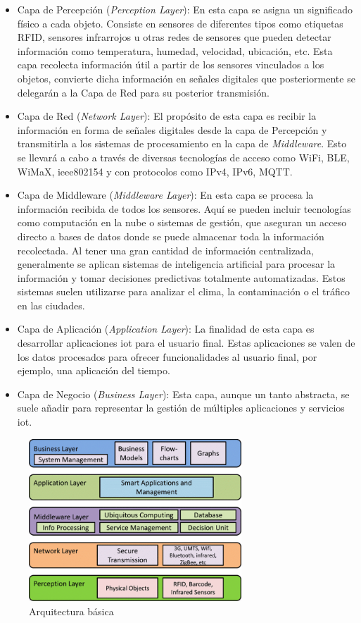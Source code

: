 \begin{itemize}


    \item Capa de Percepción (\textit{Perception Layer}): En esta capa se asigna un significado físico a cada objeto. Consiste en sensores de diferentes tipos como etiquetas RFID, sensores infrarrojos u otras redes de sensores que pueden detectar información como temperatura, humedad, velocidad, ubicación, etc. Esta capa recolecta información útil a partir de los sensores vinculados a los objetos, convierte dicha información en señales digitales que posteriormente se delegarán a la Capa de Red para su posterior transmisión.

    \item Capa de Red (\textit{Network Layer}): El propósito de esta capa es recibir la información en forma de señales digitales desde la capa de Percepción y transmitirla a los sistemas de procesamiento en la capa de \textit{Middleware}. Esto se llevará a cabo a través de diversas tecnologías de acceso como WiFi, BLE, WiMaX, ieee802154 y con protocolos como IPv4, IPv6, MQTT.

    \item Capa de Middleware (\textit{Middleware Layer}): En esta capa se procesa la información recibida de todos los sensores. Aquí se pueden incluir tecnologías como computación en la nube o sistemas de gestión, que aseguran un acceso directo a bases de datos donde se puede almacenar toda la información recolectada. Al tener una gran cantidad de información centralizada, generalmente se aplican sistemas de inteligencia artificial para procesar la información y tomar decisiones predictivas totalmente automatizadas. Estos sistemas suelen utilizarse para analizar el clima, la contaminación o el tráfico en las ciudades.

    \item Capa de Aplicación (\textit{Application Layer}): La finalidad de esta capa es desarrollar aplicaciones \gls{iot} para el usuario final. Estas aplicaciones se valen de los datos procesados para ofrecer funcionalidades al usuario final, por ejemplo, una aplicación del tiempo.

    \item Capa de Negocio (\textit{Business Layer}): Esta capa, aunque un tanto abstracta, se suele añadir para representar la gestión de múltiples aplicaciones y servicios \gls{iot}.


\end{itemize}

\begin{figure}[ht]
    \centering
    \includegraphics[width=8cm]{archivos/img/teoria/arch_edited.png}
    \caption{Arquitectura básica   \cite{carrascal2020diseno}}
    \label{fig:iotBasicArch}
\end{figure}
